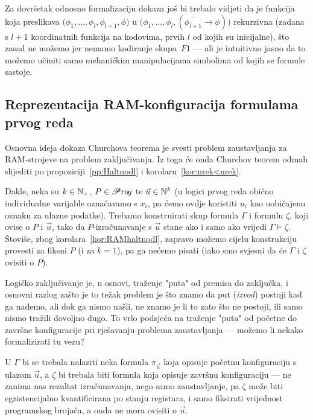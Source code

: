 Za dovršetak odnosno formalizaciju dokaza još bi trebalo vidjeti da je funkcija koja preslikava $\bigl(\phi_1,\dotsc,\phi_l,\phi_{l+1},\phi\bigr)$ u $\bigl(\phi_1,\dotsc,\phi_l,(\overline{\phi_{l+1}}\to\phi)\bigr)$ rekurzivna (zadana s $l+1$ koordinatnih funkcija na kodovima, prvih $l$ od kojih su inicijalne), što zasad ne možemo jer nemamo kodiranje skupa~$F1$ --- ali je intuitivno jasno da to možemo učiniti samo mehaničkim manipulacijama simbolima od kojih se formule sastoje.

\subsection{Reprezentacija RAM-konfiguracija formulama prvog reda}

Osnovna ideja dokaza Churchova teorema je svesti problem zaustavljanja za RAM-strojeve na problem zaključivanja. Iz toga će onda Churchov teorem odmah slijediti po propoziciji~\ref{pp:Haltnodl} i korolaru~\ref{kor:nrek<nrek}.

Dakle, neka su $k\in{\mathbb N}_+$, $P\in\mathscr Pr\mspace{-1mu}o\mspace{-2mu}g$ te $\vec u\in{\mathbb N}^k$ (u logici prvog reda obično individualne varijable označavamo s $x_i$, pa ćemo ovdje koristiti $u_i$ kao uobičajenu oznaku za ulazne podatke). Trebamo konstruirati skup formula $\Gamma$ i formulu $\zeta$, koji ovise o $P$ i $\vec u$, tako da $P$-izračunavanje s $\vec u$ stane ako i samo ako vrijedi $\Gamma\models\zeta$. Štoviše, zbog korolara~\ref{kor:RAMhaltnodl}, zapravo možemo cijelu konstrukciju provesti za fiksni $P$ (i za $k=1$), pa ga nećemo pisati (iako smo svjesni da će $\Gamma$ i $\zeta$ ovisiti o $P$).

Logičko zaključivanje je, u osnovi, traženje "puta" od premisa do zaključka, i osnovni razlog zašto je to težak problem je što znamo da put (\hspace{-1pt}\emph{izvod}) postoji kad ga nađemo, ali dok ga nismo našli, ne znamo je li to zato što ne postoji, ili samo nismo tražili dovoljno dugo. To vrlo podsjeća na traženje "puta" od početne do završne konfiguracije pri rješavanju problema zaustavljanja --- možemo li nekako formalizirati tu vezu?

U $\Gamma$ bi se trebala nalaziti neka formula $\pi_{\vec u}$ koja opisuje početnu konfiguraciju s ulazom $\vec u$, a $\zeta$ bi trebala biti formula koja opisuje završnu konfiguraciju --- ne zanima nas rezultat izračunavanja, nego samo zaustavljanje, pa $\zeta$ može biti egzistencijalno kvantificirana po stanju registara, i samo fiksirati vrijednost programskog brojača, a onda ne mora ovisiti o $\vec u$.

